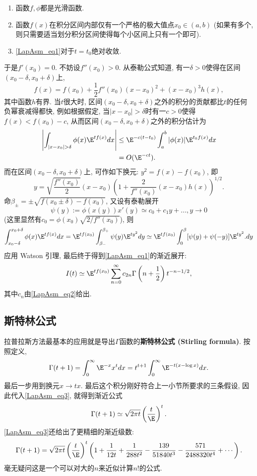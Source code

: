\begin{enumerate}
\item 函数$f,\phi$都是光滑函数.

\item 函数$f(x)$在积分区间内部仅有一个严格的极大值点$x_0\in(a,b)$ (如果有多个, 则只需要适当划分积分区间使得每个小区间上只有一个即可). 

\item \autoref{LapAsm_eq1}对于$t=t_0$绝对收敛.
\end{enumerate}

于是$f'(x_0)=0$. 不妨设$f''(x_0)>0$. 从泰勒公式知道, 有一$\delta>0$使得在区间$(x_0-\delta,x_0+\delta)$上, 
$$
f(x)=f(x_0)+\frac{1}{2}f''(x_0)(x-x_0)^2+(x-x_0)^3h(x),
$$
其中函数$h$有界. 当$t$很大时, 区间$(x_0-\delta,x_0+\delta)$之外的积分的贡献都比$t$的任何负幂衰减得都快, 例如根据假定, 当$|x-x_0|>\delta$时有一$c>0$使得$f(x)<f(x_0)-c$, 从而区间$(x_0-\delta,x_0+\delta)$之外的积分估计为
$$
\begin{aligned}
\left|\int_{|x-x_0|>\delta}\phi(x)\E^{tf(x)}dx\right|
&\leq \E^{-c(t-t_0)}\int_a^b|\phi(x)|\E^{t_0f(x)}dx\\
&=O(\E^{-ct}).
\end{aligned}
$$
而在区间$(x_0-\delta,x_0+\delta)$上, 可作如下换元: $y^2=f(x)-f(x_0)$, 即
$$
y=\sqrt{\frac{f''(x_0)}{2}}(x-x_0)\left(1+\frac{2}{f''(x_0)}(x-x_0)h(x)\right)^{1/2}.
$$
命$\beta_{\pm}=\pm\sqrt{f(x_0\pm\delta)-f(x_0)}$, 又设有泰勒展开
\begin{equation}\label{LapAsm_eq2}
\psi(y):=\phi(x(y))x'(y)\simeq c_0+c_1y+...,y\to 0
\end{equation}
(这里显然有$c_0=\phi(x_0)\sqrt{2/f''(x_0)}$), 则
$$
\int_{x_0-\delta}^{x_0+\delta}\phi(x)\E^{tf(x)}dx
=\E^{tf(x_0)}\int_{\beta_{-}}^{\beta_+}\psi(y)\E^{ty^2}dy
\simeq\E^{tf(x_0)}\int_{0}^{\beta}[\psi(y)+\psi(-y)]\E^{ty^2}.dy
$$
应用 Watson 引理, 最后终于得到\autoref{LapAsm_eq1}的渐近展开:
\begin{equation}\label{LapAsm_eq3}
I(t)\simeq \E^{tf(x_0)}\sum_{n=0}^\infty c_{2n}\Gamma\left(n+\frac{1}{2}\right)t^{-n-1/2},
\end{equation}
其中$c_n$由\autoref{LapAsm_eq2}给出.

\subsection{斯特林公式}
拉普拉斯方法最基本的应用就是导出$\Gamma$函数的\textbf{斯特林公式 (Stirling formula)}. 按照定义,
$$
\Gamma(t+1)
=\int_0^\infty \E^{-x}x^tdx
=t^{t+1}\int_0^\infty \E^{-t(x-\log x)}dx.
$$
最后一步用到换元$x\to tx$. 最后这个积分刚好符合上一小节所要求的三条假设, 因此代入\autoref{LapAsm_eq3}, 就得到渐近公式
$$
\Gamma(t+1)\simeq\sqrt{2\pi t}\left(\frac{t}{\E}\right)^t.
$$
\autoref{LapAsm_eq3}还给出了更精细的渐近级数:
$$
  \Gamma(t+1)
  =\sqrt{2\pi t}\left({t\over \E}\right)^t
  \left(
   1
   +{1\over12t}
   +{1\over288t^2}
   -{139\over51840t^3}
   -{571\over2488320t^4}
   + \cdots
  \right).
$$
毫无疑问这是一个可以对大的$n$来近似计算$n!$的公式.